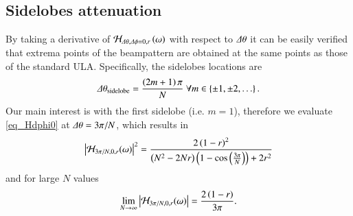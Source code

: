 \subsection*{Sidelobes attenuation}
\ifdefined\showDev
\else
\fi
By taking a derivative of $\mathcal{H}_{\Delta\theta,\Delta\phi=0,r}\left({\omega}\right)$  with respect to $\Delta\theta$ it can be easily verified that extrema points of the beampattern are obtained at the same points as those of the standard ULA. Specifically, the sidelobes locations are
\begin{equation}
    \label{eqn_CB_sidelobesLocations}
    \dTheta_{\text{sidelobe}} = \frac{\rBrace{2m+1}\pi}{N}\ \forall m\in\cBrace{\pm 1,\pm 2,\hdots}.
\end{equation}
Our main interest is with the first sidelobe (i.e. $m=1$), therefore we evaluate \eqref{eq_Hdphi0} at $\Delta\theta = 3\pi/N$, which results in
\begin{equation}
    \abs{\Hr_{{3\pi}/{N},0,r}(\omega)}^2
    =
    \frac{
    2\rBrace{1-r}^{2}
    }{
    \rBrace{N^{2}-2Nr}\rBrace{1-\cos{\rBrace{\frac{3\pi}{N}}}}+2r^{2}
    }
    \label{eq_HSidelobes}
\end{equation}
and for large $N$ values 
\begin{equation*}
    \lim_{N\rightarrow\infty}\left\vert\mathcal{H}_{3\pi/N,0,r}(\omega)\right\vert=\frac{
    2\left({1-r}\right)
    }{
    3\pi
    }.
\end{equation*}
